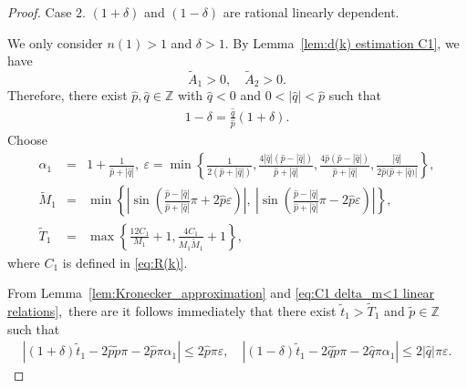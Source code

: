 \documentclass[11pt,reqno]{amsart}
\theoremstyle{definition}
\theoremstyle{remark}
\numberwithin{equation}{section}
\begin{document}
\begin{proof}

Case $2$. $(1+\delta)$ and $(1-\delta)$ are rational linearly dependent.~


We only consider $n(1) > 1$ and $\delta > 1$. By Lemma~\ref{lem:d(k) estimation C1}, we have 
\begin{equation}\label{eq:A1A2>0}
\tilde{A}_1 > 0, \quad \tilde{A}_2 > 0. 
\end{equation}
Therefore, there exist $\hat{p}, \hat{q} \in \mathbb{Z}$ with $\hat{q} < 0$ and $0 < |\hat{q}| < \hat{p}$ such that
\begin{equation}\label{eq:C1 delta_m<1 linear relations}
	\begin{aligned}
		1-\delta=\frac{\hat{q}}{\hat{p}}\left(1+\delta\right).
	\end{aligned}
\end{equation}
Choose
\begin{eqnarray}\label{eq:C1 dependent case delta<1 n(1)<1 set up}
		\alpha_1&=&1+\frac{1}{\hat{p}+|\hat{q}|},~ \varepsilon=\min\left\{\frac{1}{2(\hat{p}+|\hat{q}|)},\frac{4|\hat{q}|(\hat{p}-|\hat{q}|)}{\hat{p}+|\hat{q}|}, \frac{4\hat{p}(\hat{p}-|\hat{q}|)}{\hat{p}+|\hat{q}|},\frac{|\hat{q}|}{2\hat{p}(\hat{p}+|\hat{q})|}\right\}, \nonumber\\
		\widetilde{M}_1&=&\min\left\{\left|\sin\left(\frac{\hat{p}-|\hat{q}|}{\hat{p}+|\hat{q}|}\pi+2\hat{p}\varepsilon\right)\right|,~ \left|\sin\left(\frac{\hat{p}-|\hat{q}|}{\hat{p}+|\hat{q}|}\pi-2\hat{p}\varepsilon\right)\right|\right\},\\
		\widetilde{T}_1&=&\max\left\{\frac{12C_1}{M_1}+1,\frac{4C_1}{M_1\widetilde{M}_1}+1\right\},\nonumber
\end{eqnarray}
where $C_1$ is defined in \eqref{eq:R(k)}.

From Lemma~\ref{lem:Kronecker_approximation} and \eqref{eq:C1 delta_m<1 linear relations},~there are  it follows immediately that there exist $\tilde{t}_1 > \widetilde{T}_1$ and $\tilde{p} \in \mathbb{Z}$ such that
\begin{eqnarray*}
	\left|\left(1+\delta\right)\tilde{t}_1-2\hat{p}\tilde{p}\pi-2\hat{p}\pi\alpha_1\right| \leq 2\hat{p}\pi\varepsilon, \quad  \left| \left(1-\delta\right)\tilde{t}_1-2\hat{q}\tilde{p}\pi-2\hat{q}\pi\alpha_1 \right| \leq 2|\hat{q}|\pi\varepsilon.
\end{eqnarray*}


\end{proof}
\end{document}

